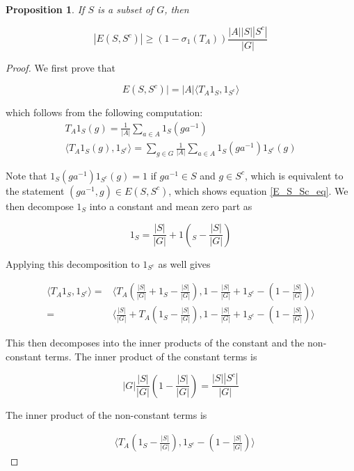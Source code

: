 \documentclass[12pt]{amsart}
\newtheorem{prop}[theorem]{Proposition}
\begin{document}
\begin{prop}
If $S$ is a subset of $G$, then 

\begin{equation}
|E(S, S^c)| \geq (1 - \sigma_1(T_A))\frac{|A| |S| |S^c|}{|G|} 
\end{equation}
\end{prop}
\begin{proof}
We first prove that 

\begin{equation}
    E(S, S^c)| = |A| \langle T_A 1_S, 1_{S^c}\rangle
    \label{E_S_Sc_eq}
\end{equation}


which follows from the following computation: 
\begin{align*}
    T_A 1_S(g) = \frac{1}{|A|} \sum_{a \in A} 1_S(ga^{-1})\\
    \langle T_A 1_S(g), 1_{S^c} \rangle = \sum_{g\in G} \frac{1}{|A|} \sum_{a \in A} 1_S(ga^{-1}) 1_{S^c}(g)
\end{align*} 

Note that $1_S(ga^{-1}) 1_{S^c}(g) = 1$ if $ga^{-1} \in S$ and $g \in S^c$, which is equivalent to the statement $(ga^{-1}, g) \in E(S, S^c)$, which shows equation \ref{E_S_Sc_eq}. We then decompose $1_S$ into a constant and mean zero part as  

\[ 1_S = \frac{|S|}{|G|}  +  1(_S - \frac{|S|}{|G|}) \]

Applying this decomposition to $1_{S^c}$ as well gives 

\begin{align*}
    \langle T_A 1_S, 1_{S^c} \rangle 
    = & \langle T_A \left(\frac{|S|}{|G|}  +  1_S - \frac{|S|}{|G|}\right),  1 - \frac{|S|}{|G|} +  1_{S^c} - (1 - \frac{|S|}{|G|} )\rangle \\
     = &  \langle \frac{|S|}{|G|}  +  T_A \left(1_S - \frac{|S|}{|G|}\right),  1 - \frac{|S|}{|G|} +  1_{S^c} - (1 - \frac{|S|}{|G|} )\rangle 
\end{align*} 

This then decomposes into the inner products of the constant and the non-constant terms. The inner product of the constant terms is 

$$ |G| \frac{|S|}{|G|} (1 - \frac{|S|}{|G|} )  = \frac{|S||S^c|}{|G|}  $$ 

The inner product of the non-constant terms is 

\begin{align*}
     &  \langle  T_A \left(1_S - \frac{|S|}{|G|}\right),  1_{S^c} - (1 - \frac{|S|}{|G|} )\rangle 
\end{align*}


\end{proof}
\end{document}
